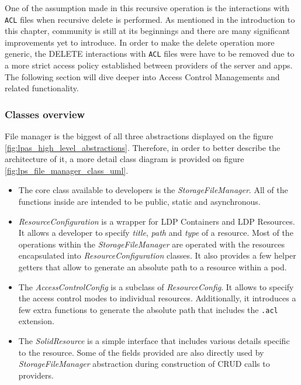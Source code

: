 One of the assumption made in this recursive operation is the interactions with \texttt{ACL} files when recursive delete is performed. As mentioned in the introduction to this chapter, \solid{} community is still at its beginnings and there are many significant improvements yet to introduce. In order to make the delete operation more generic, the DELETE interactions with \texttt{ACL} files were have to be removed due to a more strict access policy established between providers of the server and \solid{} apps. The following section will dive deeper into Access Control Managements and related functionality.

\subsubsection{Classes overview}

File manager is the biggest of all three abstractions displayed on the figure \ref{fig:lpas_high_level_abstractions}. Therefore, in order to better describe the architecture of it, a more detail class diagram is provided on figure \ref{fig:lps_file_manager_class_uml}.

\begin{itemize}
	\item The core class available to \lpa{} developers is the \textit{StorageFileManager}. All of the functions inside are intended to be public, static and asynchronous. 
	\item \textit{ResourceConfiguration} is a wrapper for LDP Containers and LDP Resources. It allows a developer to specify \textit{title}, \textit{path} and \textit{type} of a resource. Most of the operations within the \textit{StorageFileManager} are operated with the resources encapsulated into \textit{ResourceConfiguration} classes. It also provides a few helper getters that allow to generate an absolute path to a resource within a pod. 
	\item The \textit{AccessControlConfig} is a subclass of \textit{ResourceConfig}. It allows to specify the access control modes to individual resources. Additionally, it introduces a few extra functions to generate the absolute path that includes the \texttt{.acl} extension.   
	\item The \textit{SolidResource} is a simple interface that includes various details specific to the resource. Some of the fields provided are also directly used by \textit{StorageFileManager} abstraction during construction of CRUD calls to \solid{} providers.
\end{itemize}


